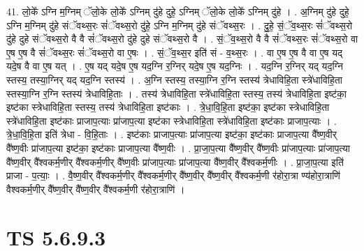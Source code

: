 \documentclass[17pt]{extarticle}
\begin{document}
41. लो॒के᳚ ऽग्नि म॒ग्निम् ॅलो॒के लो॒के᳚ ऽग्निम् दु॑हे दुहे॒ ऽग्निम् ॅलो॒के लो॒के᳚ ऽग्निम् दु॑हे । . अ॒ग्निम् दु॑हे दुहे॒ ऽग्नि म॒ग्निम् दु॑हे संॅवथ्स॒रः सं॑ॅवथ्स॒रो दु॑हे॒ ऽग्नि म॒ग्निम् दु॑हे संॅवथ्स॒रः । . दु॒हे॒ सं॒ॅव॒थ्स॒रः सं॑ॅवथ्स॒रो दु॑हे दुहे संॅवथ्स॒रो वै वै सं॑ॅवथ्स॒रो दु॑हे दुहे संॅवथ्स॒रो वै । . सं॒ॅव॒थ्स॒रो वै वै सं॑ॅवथ्स॒रः सं॑ॅवथ्स॒रो वा ए॒ष ए॒ष वै सं॑ॅवथ्स॒रः सं॑ॅवथ्स॒रो वा ए॒षः । . सं॒ॅव॒थ्स॒र इति॑ सं - व॒थ्स॒रः । . वा ए॒ष ए॒ष वै वा ए॒ष यद् यदे॒ष वै वा ए॒ष यत् । . ए॒ष यद् यदे॒ष ए॒ष यद॒ग्नि र॒ग्निर् यदे॒ष ए॒ष यद॒ग्निः । . यद॒ग्नि र॒ग्निर् यद् यद॒ग्नि स्तस्य॒ तस्या॒ग्निर् यद् यद॒ग्नि स्तस्य॑ । . अ॒ग्नि स्तस्य॒ तस्या॒ग्नि र॒ग्नि स्तस्य॑ त्रेधाविहि॒ता स्त्रे॑धाविहि॒ता स्तस्या॒ग्नि र॒ग्नि स्तस्य॑ त्रेधाविहि॒ताः । . तस्य॑ त्रेधाविहि॒ता स्त्रे॑धाविहि॒ता स्तस्य॒ तस्य॑ त्रेधाविहि॒ता इष्ट॑का॒ इष्ट॑का स्त्रेधाविहि॒ता स्तस्य॒ तस्य॑ त्रेधाविहि॒ता इष्ट॑काः । . त्रे॒धा॒वि॒हि॒ता इष्ट॑का॒ इष्ट॑का स्त्रेधाविहि॒ता स्त्रे॑धाविहि॒ता इष्ट॑काः प्राजाप॒त्याः प्रा॑जाप॒त्या इष्ट॑का स्त्रेधाविहि॒ता स्त्रे॑धाविहि॒ता इष्ट॑काः प्राजाप॒त्याः । . त्रे॒धा॒वि॒हि॒ता इति॑ त्रेधा - वि॒हि॒ताः । . इष्ट॑काः प्राजाप॒त्याः प्रा॑जाप॒त्या इष्ट॑का॒ इष्ट॑काः प्राजाप॒त्या वै᳚ष्ण॒वीर् वै᳚ष्ण॒वीः प्रा॑जाप॒त्या इष्ट॑का॒ इष्ट॑काः प्राजाप॒त्या वै᳚ष्ण॒वीः । . प्रा॒जा॒प॒त्या वै᳚ष्ण॒वीर् वै᳚ष्ण॒वीः प्रा॑जाप॒त्याः प्रा॑जाप॒त्या वै᳚ष्ण॒वीर् वै᳚श्वकर्म॒णीर् वै᳚श्वकर्म॒णीर् वै᳚ष्ण॒वीः प्रा॑जाप॒त्याः प्रा॑जाप॒त्या वै᳚ष्ण॒वीर् वै᳚श्वकर्म॒णीः । . प्रा॒जा॒प॒त्या इति॑ प्राजा - प॒त्याः॒ । . वै॒ष्ण॒वीर् वै᳚श्वकर्म॒णीर् वै᳚श्वकर्म॒णीर् वै᳚ष्ण॒वीर् वै᳚ष्ण॒वीर् वै᳚श्वकर्म॒णी र॑होरा॒त्रा
ण्य॑होरा॒त्राणि॑ वैश्वकर्म॒णीर् वै᳚ष्ण॒वीर् वै᳚ष्ण॒वीर् वै᳚श्वकर्म॒णी र॑होरा॒त्राणि॑ । \newline
\pagebreak
{}

\section{ TS 5.6.9.3 }
\end{document}
